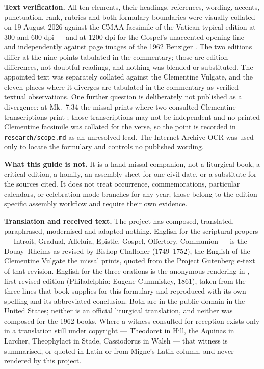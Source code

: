 \textbf{Text verification.} All ten elements, their headings, references,
wording, accents, punctuation, rank, rubrics and both formulary boundaries were
visually collated on 19 August 2026 against the CMAA facsimile of the Vatican
typical edition at 300 and 600 dpi --- and at 1200 dpi for the Gospel's
unaccented opening line --- and independently against page images of the 1962
Benziger . The two editions differ at the nine
points tabulated in the commentary; those are edition differences, not doubtful
readings, and nothing was blended or substituted. The appointed text was
separately collated against the Clementine Vulgate, and the eleven places where
it diverges are tabulated in the commentary as verified textual observations.
One further question is deliberately not published as a divergence: at
Mk.~7:34 the missal prints  where two consulted
Clementine transcriptions print ; those transcriptions may not
be independent and no printed Clementine facsimile was collated for the verse,
so the point is recorded in \texttt{research/scope.md} as an unresolved lead.
The Internet Archive OCR was used only to locate the formulary and controls no
published wording.

\textbf{What this guide is not.} It is a hand-missal companion, not a
liturgical book, a critical edition, a homily, an assembly sheet for one civil
date, or a substitute for the sources cited. It does not treat occurrence,
commemorations, particular calendars, or celebration-mode branches for any
year; those belong to the edition-specific assembly workflow and require their
own evidence.

\textbf{Translation and received text.} The project has composed, translated,
paraphrased, modernised and adapted nothing. English for the scriptural
propers --- Introit, Gradual, Alleluia, Epistle, Gospel, Offertory, Communion
--- is the Douay--Rheims as revised by Bishop Challoner (1749--1752), the
English of the Clementine Vulgate the missal prints, quoted from the Project
Gutenberg e-text of that revision. English for the three orations is the
anonymous rendering in , first revised edition (Philadelphia: Eugene
Cummiskey, 1861), taken from the three lines that book supplies for this
formulary and reproduced with its own spelling and its abbreviated conclusion.
Both are in the public domain in the United States; neither is an official
liturgical translation, and neither was composed for the 1962 books. Where a
witness consulted for reception exists only in a translation still under
copyright --- Theodoret in Hill, the Aquinas  in Larcher,
Theophylact in Stade, Cassiodorus in Walsh --- that witness is summarised, or
quoted in Latin or from Migne's Latin column, and never rendered by this
project.

